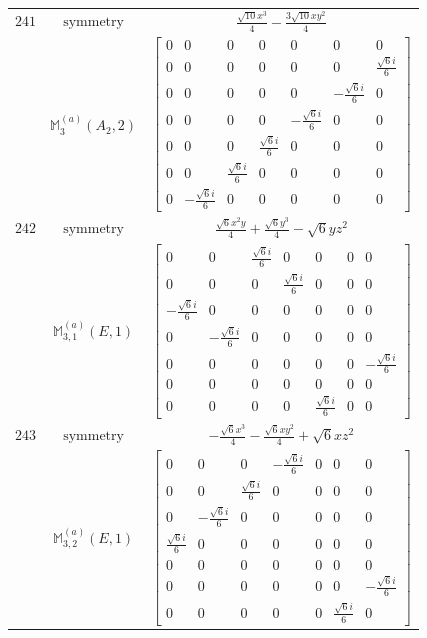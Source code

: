 \documentclass[fleqn,8pt,landscape]{jsarticle}
\begin{document}
\begin{longtable}{ccc}
$ 241 $ & $ \text{symmetry} $ & $ \frac{\sqrt{10} x^{3}}{4} - \frac{3 \sqrt{10} x y^{2}}{4} $ \\
$  $ & $ \mathbb{M}_{3}^{(a)}(A_{2},2) $ & $ \begin{bmatrix} 0 & 0 & 0 & 0 & 0 & 0 & 0 \\ 0 & 0 & 0 & 0 & 0 & 0 & \frac{\sqrt{6} i}{6} \\ 0 & 0 & 0 & 0 & 0 & - \frac{\sqrt{6} i}{6} & 0 \\ 0 & 0 & 0 & 0 & - \frac{\sqrt{6} i}{6} & 0 & 0 \\ 0 & 0 & 0 & \frac{\sqrt{6} i}{6} & 0 & 0 & 0 \\ 0 & 0 & \frac{\sqrt{6} i}{6} & 0 & 0 & 0 & 0 \\ 0 & - \frac{\sqrt{6} i}{6} & 0 & 0 & 0 & 0 & 0 \end{bmatrix} $ \\ \hline
$ 242 $ & $ \text{symmetry} $ & $ \frac{\sqrt{6} x^{2} y}{4} + \frac{\sqrt{6} y^{3}}{4} - \sqrt{6} y z^{2} $ \\
$  $ & $ \mathbb{M}_{3,1}^{(a)}(E,1) $ & $ \begin{bmatrix} 0 & 0 & \frac{\sqrt{6} i}{6} & 0 & 0 & 0 & 0 \\ 0 & 0 & 0 & \frac{\sqrt{6} i}{6} & 0 & 0 & 0 \\ - \frac{\sqrt{6} i}{6} & 0 & 0 & 0 & 0 & 0 & 0 \\ 0 & - \frac{\sqrt{6} i}{6} & 0 & 0 & 0 & 0 & 0 \\ 0 & 0 & 0 & 0 & 0 & 0 & - \frac{\sqrt{6} i}{6} \\ 0 & 0 & 0 & 0 & 0 & 0 & 0 \\ 0 & 0 & 0 & 0 & \frac{\sqrt{6} i}{6} & 0 & 0 \end{bmatrix} $ \\ \hline
$ 243 $ & $ \text{symmetry} $ & $ - \frac{\sqrt{6} x^{3}}{4} - \frac{\sqrt{6} x y^{2}}{4} + \sqrt{6} x z^{2} $ \\
$  $ & $ \mathbb{M}_{3,2}^{(a)}(E,1) $ & $ \begin{bmatrix} 0 & 0 & 0 & - \frac{\sqrt{6} i}{6} & 0 & 0 & 0 \\ 0 & 0 & \frac{\sqrt{6} i}{6} & 0 & 0 & 0 & 0 \\ 0 & - \frac{\sqrt{6} i}{6} & 0 & 0 & 0 & 0 & 0 \\ \frac{\sqrt{6} i}{6} & 0 & 0 & 0 & 0 & 0 & 0 \\ 0 & 0 & 0 & 0 & 0 & 0 & 0 \\ 0 & 0 & 0 & 0 & 0 & 0 & - \frac{\sqrt{6} i}{6} \\ 0 & 0 & 0 & 0 & 0 & \frac{\sqrt{6} i}{6} & 0 \end{bmatrix} $ \\ \hline

\end{longtable}
\end{document}
